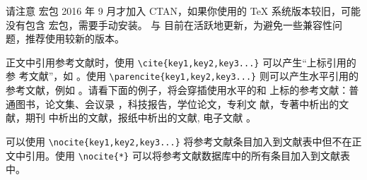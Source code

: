 请注意  宏包 2016 年 9 月才加入 CTAN，如果你使用的
\TeX{} 系统版本较旧，可能没有包含  宏包，需要手动安装。
\BibLaTeX{} 与  目前在活跃地更新，为避免一些兼容性问
题，推荐使用较新的版本。

正文中引用参考文献时，使用 \verb|\cite{key1,key2,key3...}| 可以产生“上标引用的参
考文献”，如 \cite{Yu2001,Cheng1999,LSC1957}。使用
\verb|\parencite{key1,key2,key3...}| 则可以产生水平引用的参考文献，例如
\parencite{Li1999,Jiang1989,Hopkinson1999}。请看下面的例子，将会穿插使用水平的和
上标的参考文献：普通图书\parencite{Yu2001,Jiang1998}，论文集、会议录
\cite{CSTAM1990}，科技报告\parencite{WHO1970}，学位论文\cite{Zhang1998}，专利文
献\parencite{Jiang1989,HBLZ2001}，专著中析出的文献\cite{Cheng1999,GBT2659}，期刊
中析出的文献\parencite{Li1999,Li2000}，报纸中析出的文献\cite{Ding2000}, 电子文献
\parencite{Jiang1999,Christine1998,Xiao2001}。

可以使用 \verb|\nocite{key1,key2,key3...}| 将参考文献条目加入到文献表中但不在正
文中引用。使用 \verb|\nocite{*}| 可以将参考文献数据库中的所有条目加入到文献表
中。
\nocite{Yang1999,Schinstock2000,Wen1990,GBT16159}
